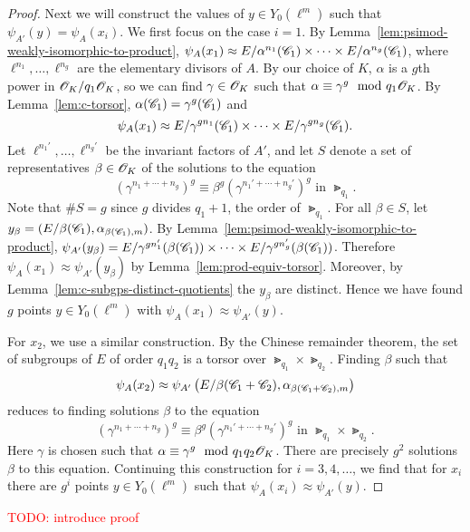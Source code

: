 \documentclass{amsart}
\begin{document}
\begin{proof}
    Next we will construct the values of $y \in Y_0(\ell^m)$ such that $\psi_{A'}(y) = \psi_{A}(x_i)$. We first focus on the case $i = 1$. By Lemma~\ref{lem:psimod-weakly-isomorphic-to-product}, $\psi_{A}(x_1) \approx E/\alpha^{n_1}(\mathscr{C}_1) \times \cdots \times E/\alpha^{n_g}(\mathscr{C}_1)$, where $\ell^{n_1},\dots,\ell^{n_g}$ are the elementary divisors of $A$. By our choice of $K$, $\alpha$ is a $g$th power in $\mathscr{O}_K/q_1\mathscr{O}_K$, so we can find $\gamma \in \mathscr{O}_K$ such that $\alpha \equiv \gamma^g \mod{q_1\mathscr{O}_K}$. By Lemma~\ref{lem:c-torsor}, $\alpha(\mathscr{C}_1) = \gamma^g(\mathscr{C}_1)$ and
    \[
      \psi_{A}(x_1) \approx E/\gamma^{gn_1}(\mathscr{C}_1) \times \cdots \times E/\gamma^{gn_g}(\mathscr{C}_1).
    \]
    Let $\ell^{n_1'},\dots,\ell^{n_g'}$ be the invariant factors of $A'$, and let $S$ denote a set of representatives $\beta \in \mathscr{O}_K$ of the solutions to the equation
    \[
      \left(\gamma^{n_1 + \cdots + n_g}\right)^g \equiv \beta^g\left(\gamma^{n_1' + \cdots + n_g'}\right)^g
      \text{ in } \Gt_{q_1}.
    \]
    Note that $\#S = g$ since $g$ divides $q_1 + 1$, the order of $\Gt_{q_1}$. For all $\beta \in S$, let $y_\beta = (E/\beta(\mathscr{C}_1),\alpha_{\beta(\mathscr{C}_1),m})$. By Lemma~\ref{lem:psimod-weakly-isomorphic-to-product}, $\psi_{A'}(y_\beta) = E/\gamma^{gn_1'}(\beta(\mathscr{C}_1)) \times \cdots \times E/\gamma^{gn_g'}(\beta(\mathscr{C}_1))$. Therefore $\psi_A(x_1) \approx \psi_{A'}(y_\beta)$ by Lemma~\ref{lem:prod-equiv-torsor}. Moreover, by Lemma~\ref{lem:c-subgps-distinct-quotients} the $y_\beta$ are distinct. Hence we have found $g$ points $y \in Y_0(\ell^m)$ with $\psi_{A}(x_1) \approx \psi_{A'}(y)$.

  For $x_2$, we use a similar construction. By the Chinese remainder theorem, the set of subgroups of $E$ of order $q_1q_2$ is a torsor over $\Gt_{q_1} \times \Gt_{q_2}$. Finding $\beta$ such that
  \[
    \psi_{A}(x_2) \approx \psi_{A'}\left(E/\beta(\mathscr{C}_1+\mathscr{C}_2),\alpha_{\beta(\mathscr{C}_1+\mathscr{C}_2),m}\right)
  \]
  reduces to finding solutions $\beta$ to the equation
  \[
    \left(\gamma^{n_1 + \cdots + n_g}\right)^g \equiv \beta^g\left(\gamma^{n_1' + \cdots + n_g'}\right)^g
    \text{ in } \Gt_{q_1} \times \Gt_{q_2}.
  \]
  Here $\gamma$ is chosen such that $\alpha \equiv \gamma^g \mod{q_1q_2\mathscr{O}_K}$. There are precisely $g^2$ solutions $\beta$ to this equation. Continuing this construction for $i=3,4,\dots$, we find that for $x_i$ there are $g^i$ points $y \in Y_0(\ell^m)$ such that $\psi_{A}(x_i) \approx \psi_{A'}(y)$.
\end{proof}

\textcolor{red}{TODO: introduce proof}
\end{document}
